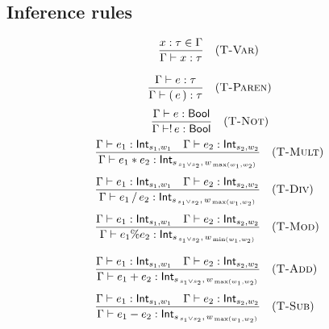 \subsection*{Inference rules}

\[
  \begin{aligned}
    \frac{x:\tau\in\Gamma}{\Gamma \vdash x : \tau}
     & \quad(\textsc{T-Var})   \\[2ex]
    \frac{\Gamma \vdash e : \tau}{\Gamma \vdash (\,e\,) : \tau}
     & \quad(\textsc{T-Paren})
  \end{aligned}
\]
\[
  \frac{\Gamma \vdash e : \mathsf{Bool}}
  {\Gamma \vdash !\,e : \mathsf{Bool}}
  \quad(\textsc{T-Not})
\]
\[
  \begin{aligned}
    \frac{\Gamma \vdash e_1 : \mathsf{Int}_{s_1,w_1}
    \quad
    \Gamma \vdash e_2 : \mathsf{Int}_{s_2,w_2}}
    {\Gamma \vdash e_1 * e_2 : \mathsf{Int}_{s_{\,s_1\lor s_2},\,w_{\,\max(w_1, w_2)}}}
     & \quad(\textsc{T-Mult}) \\[1ex]
    \frac{\Gamma \vdash e_1 : \mathsf{Int}_{s_1,w_1}
    \quad
    \Gamma \vdash e_2 : \mathsf{Int}_{s_2,w_2}}
    {\Gamma \vdash e_1 \,/\, e_2 : \mathsf{Int}_{s_{\,s_1\lor s_2},\,w_{\,\max(w_1, w_2)}}}
     & \quad(\textsc{T-Div})  \\[1ex]
    \frac{\Gamma \vdash e_1 : \mathsf{Int}_{s_1,w_1}
    \quad
    \Gamma \vdash e_2 : \mathsf{Int}_{s_2,w_2}}
    {\Gamma \vdash e_1 \% e_2 : \mathsf{Int}_{s_{\,s_1\lor s_2},\,w_{\,\min(w_1, w_2)}}}
     & \quad(\textsc{T-Mod})  \\[2ex]
    \frac{\Gamma \vdash e_1 : \mathsf{Int}_{s_1,w_1}
    \quad
    \Gamma \vdash e_2 : \mathsf{Int}_{s_2,w_2}}
    {\Gamma \vdash e_1 + e_2 : \mathsf{Int}_{s_{\,s_1\lor s_2},\,w_{\,\max(w_1, w_2)}}}
     & \quad(\textsc{T-Add})  \\[1ex]
    \frac{\Gamma \vdash e_1 : \mathsf{Int}_{s_1,w_1}
    \quad
    \Gamma \vdash e_2 : \mathsf{Int}_{s_2,w_2}}
    {\Gamma \vdash e_1 - e_2 : \mathsf{Int}_{s_{\,s_1\lor s_2},\,w_{\,\max(w_1, w_2)}}}
     & \quad(\textsc{T-Sub})
  \end{aligned}
\]

